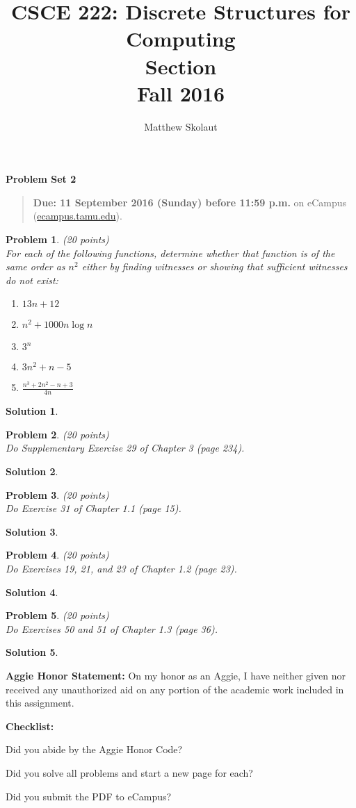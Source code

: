 \documentclass{article}
\title{CSCE 222: Discrete Structures for Computing\\Section \mysectionnumber\\Fall 2016}
\author{Matthew Skolaut}
\theoremstyle{plain}
\newtheorem{problem}{Problem}
\theoremstyle{break}
\newtheorem{solution}{Solution}
\newcommand{\honor}{\noindent \textbf{Aggie Honor Statement: }On my honor as an Aggie, I have neither
  given nor received any unauthorized aid on any portion of the academic work included in this assignment.
}
\newcommand{\checklist}{\noindent\textbf{Checklist:}
\begin{compactenum}
\item Did you abide by the Aggie Honor Code?
\item Did you solve all problems and start a new page for each? 
\item Did you submit the PDF to eCampus?
\end{compactenum}
}
\newcommand{\problemset}[1]{\begin{center}\textbf{Problem Set #1}\end{center}}
\newcommand{\duedate}[1]{\begin{quote}\textbf{Due: #1} on eCampus (\url{ecampus.tamu.edu}).\end{quote}}
\begin{document}
\maketitle

\problemset{2}

\duedate{11 September 2016 (Sunday) before 11:59 p.m.}

\bigskip

\begin{problem} (20 points)\\
For each of the following functions, determine whether that function is of the same order as $n^2$ either by finding witnesses or showing that sufficient witnesses do not exist:
\begin{enumerate}
\item $13n+12$
\item $n^2+1000 n\log{n}$
\item $3^n$
\item $3n^2+n-5$
\item $\displaystyle \frac{n^3+2n^2-n+3}{4n}$
\end{enumerate}
\end{problem}

\begin{solution}
\end{solution}

\newpage

\begin{problem} (20 points)\\
Do Supplementary Exercise 29 of Chapter 3 (page 234).
\end{problem}

\begin{solution}
\end{solution}

\newpage

\begin{problem} (20 points)\\
Do  Exercise 31 of Chapter 1.1 (page 15).
\end{problem}

\begin{solution}
\end{solution}

\newpage

\begin{problem} (20 points)\\
Do  Exercises 19, 21, and 23 of Chapter 1.2 (page 23).
\end{problem}

\begin{solution}
\end{solution}

\newpage

\begin{problem} (20 points)\\
Do  Exercises 50 and 51 of Chapter 1.3 (page 36).
\end{problem}

\begin{solution}
\end{solution}

\bigskip
\honor

\bigskip
\checklist
\end{document}
